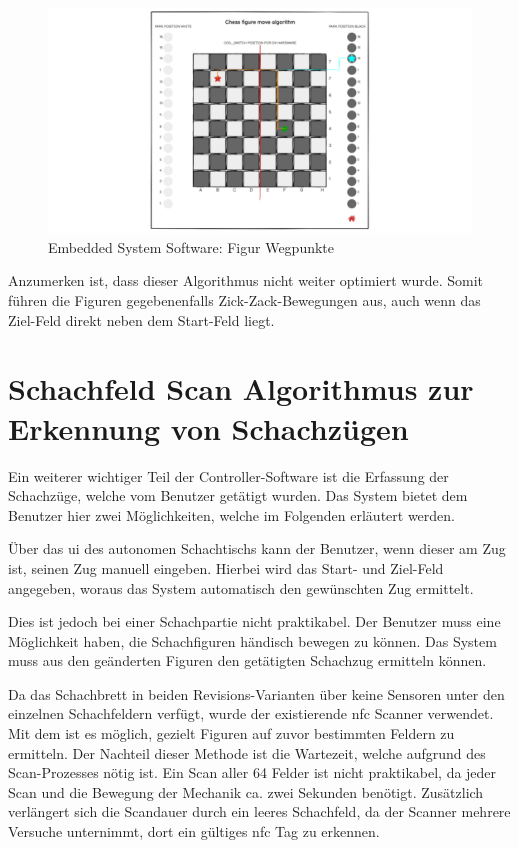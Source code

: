 \begin{figure}
\centering
\includegraphics{images/ATC_FigureMoveAlgorithm.png}
\caption{Embedded System Software: Figur Wegpunkte
\label{ATC_FigureMoveAlgorithm}}
\end{figure}

Anzumerken ist, dass dieser Algorithmus nicht weiter optimiert wurde.
Somit führen die Figuren gegebenenfalls Zick-Zack-Bewegungen aus, auch
wenn das Ziel-Feld direkt neben dem Start-Feld liegt.

\hypertarget{schachfeld-scan-algorithmus-zur-erkennung-von-schachzuxfcgen}{%
\section{Schachfeld Scan Algorithmus zur Erkennung von
Schachzügen}\label{schachfeld-scan-algorithmus-zur-erkennung-von-schachzuxfcgen}}

Ein weiterer wichtiger Teil der Controller-Software ist die Erfassung
der Schachzüge, welche vom Benutzer getätigt wurden. Das System bietet
dem Benutzer hier zwei Möglichkeiten, welche im Folgenden erläutert
werden.

Über das \gls{ui} des autonomen Schachtischs kann der Benutzer, wenn
dieser am Zug ist, seinen Zug manuell eingeben. Hierbei wird das Start-
und Ziel-Feld angegeben, woraus das System automatisch den gewünschten
Zug ermittelt.

Dies ist jedoch bei einer Schachpartie nicht praktikabel. Der Benutzer
muss eine Möglichkeit haben, die Schachfiguren händisch bewegen zu
können. Das System muss aus den geänderten Figuren den getätigten
Schachzug ermitteln können.

Da das Schachbrett in beiden Revisions-Varianten über keine Sensoren
unter den einzelnen Schachfeldern verfügt, wurde der existierende
\gls{nfc} Scanner verwendet. Mit dem ist es möglich, gezielt Figuren auf
zuvor bestimmten Feldern zu ermitteln. Der Nachteil dieser Methode ist
die Wartezeit, welche aufgrund des Scan-Prozesses nötig ist. Ein Scan
aller 64 Felder ist nicht praktikabel, da jeder Scan und die Bewegung
der Mechanik ca. zwei Sekunden benötigt. Zusätzlich verlängert sich die
Scandauer durch ein leeres Schachfeld, da der Scanner mehrere Versuche
unternimmt, dort ein gültiges \gls{nfc} Tag zu erkennen.

